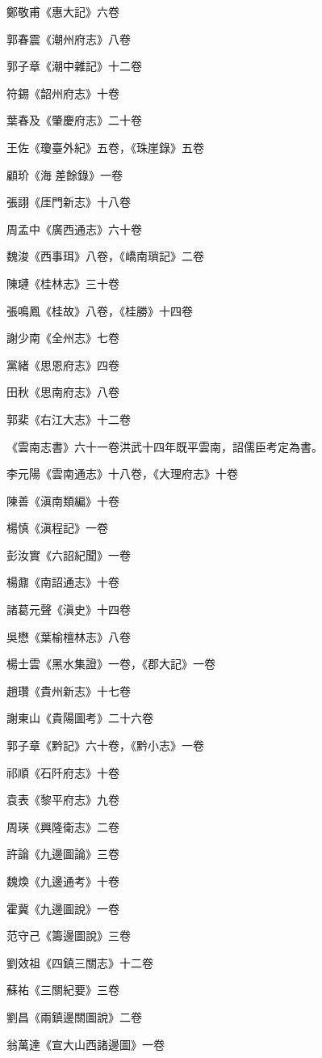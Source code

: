 鄭敬甫《惠大記》六卷

郭春震《潮州府志》八卷

郭子章《潮中雜記》十二卷

符錫《韶州府志》十卷

葉春及《肇慶府志》二十卷

王佐《瓊臺外紀》五卷，《珠崖錄》五卷

顧玠《海差餘錄》一卷

張詡《厓門新志》十八卷

周孟中《廣西通志》六十卷

魏浚《西事珥》八卷，《嶠南瑣記》二卷

陳璉《桂林志》三十卷

張鳴鳳《桂故》八卷，《桂勝》十四卷

謝少南《全州志》七卷

黨緒《思恩府志》四卷

田秋《思南府志》八卷

郭棐《右江大志》十二卷

《雲南志書》六十一卷洪武十四年既平雲南，詔儒臣考定為書。

李元陽《雲南通志》十八卷，《大理府志》十卷

陳善《滇南類編》十卷

楊慎《滇程記》一卷

彭汝實《六詔紀聞》一卷

楊鼐《南詔通志》十卷

諸葛元聲《滇史》十四卷

吳懋《葉榆檀林志》八卷

楊士雲《黑水集證》一卷，《郡大記》一卷

趙瓚《貴州新志》十七卷

謝東山《貴陽圖考》二十六卷

郭子章《黔記》六十卷，《黔小志》一卷

祁順《石阡府志》十卷

袁表《黎平府志》九卷

周瑛《興隆衛志》二卷

許論《九邊圖論》三卷

魏煥《九邊通考》十卷

霍冀《九邊圖說》一卷

范守己《籌邊圖說》三卷

劉效祖《四鎮三關志》十二卷

蘇祐《三關紀要》三卷

劉昌《兩鎮邊關圖說》二卷

翁萬達《宣大山西諸邊圖》一卷

